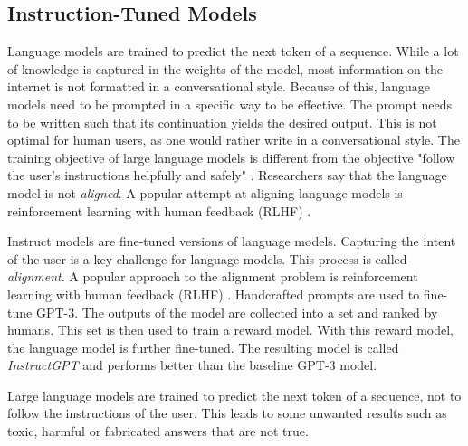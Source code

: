 \documentclass[../main.tex]{subfiles}
\begin{document}
\subsection{Instruction-Tuned Models}

Language models are trained to predict the next token of a sequence.
While a lot of knowledge is captured in the weights of the model,
most information on the internet is not formatted in a conversational style.
Because of this, language models need to be prompted in a specific way to be effective.
The prompt needs to be written such that its continuation yields the desired output.
This is not optimal for human users, as one would rather write in a conversational style.
The training objective of large language models is different from the objective
"follow the user's instructions helpfully and safely" \cite{Ouyang2022}.
Researchers say that the language model is not \emph{aligned}.
A popular attempt at aligning language models is reinforcement learning with human feedback (RLHF) \cite{Ouyang2022}.


Instruct models are fine-tuned versions of language models.
Capturing the intent of the user is a key challenge for language models.
This process is called \emph{alignment}.
A popular approach to the alignment problem is reinforcement learning with human feedback (RLHF) \cite{Ouyang2022}.
Handcrafted prompts are used to fine-tune GPT-3.
The outputs of the model are collected into a set and ranked by humans.
This set is then used to train a reward model.
With this reward model, the language model is further fine-tuned.
The resulting model is called \emph{InstructGPT} and performs better than the baseline GPT-3 model.

Large language models are trained to predict the next token of a sequence,
not to follow the instructions of the user.
This leads to some unwanted results such as toxic, harmful or fabricated answers that are not true.
\end{document}
